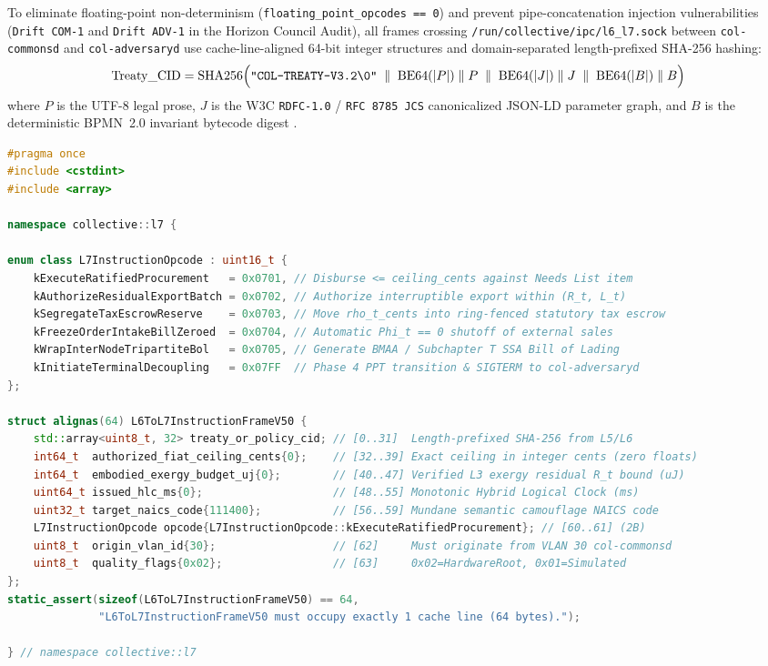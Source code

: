To eliminate floating-point non-determinism (\texttt{floating\_point\_opcodes == 0}) and prevent pipe-concatenation injection vulnerabilities (\texttt{Drift COM-1} and \texttt{Drift ADV-1} in the Horizon Council Audit), all frames crossing \texttt{/run/collective/ipc/l6\_l7.sock} between \texttt{col-commonsd} and \texttt{col-adversaryd} use cache-line-aligned 64-bit integer structures and domain-separated length-prefixed SHA-256 hashing:
\begin{equation}
\mathrm{Treaty\_CID} = \mathrm{SHA256}\Bigl(\texttt{"COL-TREATY-V3.2\textbackslash0"} \;\parallel\; \mathrm{BE64}(|P|) \parallel P \;\parallel\; \mathrm{BE64}(|J|) \parallel J \;\parallel\; \mathrm{BE64}(|B|) \parallel B\Bigr)
\label{eq:ch1-length-prefixed-cid}
\end{equation}
where $P$ is the UTF-8 legal prose, $J$ is the W3C \texttt{RDFC-1.0} / \texttt{RFC 8785 JCS} canonicalized JSON-LD parameter graph, and $B$ is the deterministic BPMN~2.0 invariant bytecode digest \parencite{rfc8785,w3c2024rdfc,grigg2004}.

\begin{lstlisting}[language=C++,caption={Cache-Line-Aligned Fixed-Point Layer 6 to Layer 7 Instruction and Tribute Frames (\texttt{l6\_l7\_wire.hpp})}]
#pragma once
#include <cstdint>
#include <array>

namespace collective::l7 {

enum class L7InstructionOpcode : uint16_t {
    kExecuteRatifiedProcurement   = 0x0701, // Disburse <= ceiling_cents against Needs List item
    kAuthorizeResidualExportBatch = 0x0702, // Authorize interruptible export within (R_t, L_t)
    kSegregateTaxEscrowReserve    = 0x0703, // Move rho_t_cents into ring-fenced statutory tax escrow
    kFreezeOrderIntakeBillZeroed  = 0x0704, // Automatic Phi_t == 0 shutoff of external sales
    kWrapInterNodeTripartiteBol   = 0x0705, // Generate BMAA / Subchapter T SSA Bill of Lading
    kInitiateTerminalDecoupling   = 0x07FF  // Phase 4 PPT transition & SIGTERM to col-adversaryd
};

struct alignas(64) L6ToL7InstructionFrameV50 {
    std::array<uint8_t, 32> treaty_or_policy_cid; // [0..31]  Length-prefixed SHA-256 from L5/L6
    int64_t  authorized_fiat_ceiling_cents{0};    // [32..39] Exact ceiling in integer cents (zero floats)
    int64_t  embodied_exergy_budget_uj{0};        // [40..47] Verified L3 exergy residual R_t bound (uJ)
    uint64_t issued_hlc_ms{0};                    // [48..55] Monotonic Hybrid Logical Clock (ms)
    uint32_t target_naics_code{111400};           // [56..59] Mundane semantic camouflage NAICS code
    L7InstructionOpcode opcode{L7InstructionOpcode::kExecuteRatifiedProcurement}; // [60..61] (2B)
    uint8_t  origin_vlan_id{30};                  // [62]     Must originate from VLAN 30 col-commonsd
    uint8_t  quality_flags{0x02};                 // [63]     0x02=HardwareRoot, 0x01=Simulated
};
static_assert(sizeof(L6ToL7InstructionFrameV50) == 64,
              "L6ToL7InstructionFrameV50 must occupy exactly 1 cache line (64 bytes).");

} // namespace collective::l7
\end{lstlisting}

